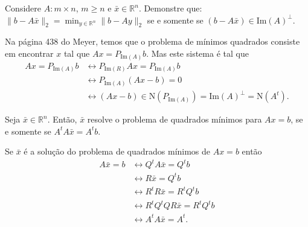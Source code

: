 \documentclass[a4paper,12pt, leqno, answers]{exam}
\begin{document}
\thispagestyle{headandfoot}
\begin{questions}
    \question Considere $A : m \times n$, $m \geq n$ e $\bar{x} \in \mathbb{R}^n$. Demonstre que: $\| b - A \bar{x} \|_2 = \min_{y \in \mathbb{R}^n} \| b - A y \|_2$ se e somente se $(b - A \bar{x}) \in \text{Im}(A)^\perp$.
    \begin{solution}
        Na p\'{a}gina 438 do Meyer\nocite{Meyer:2000:matrix}, temos que o problema de m\'{i}nimos quadrados consiste em encontrar $x$ tal que $A x = P_{\text{Im}(A)} b$. Mas este sistema \'{e} tal que
        \begin{align*}
            A x = P_{\text{Im}(A)} b &\leftrightarrow P_{\text{Im}(R)} A x = P_{\text{Im}(A)} b \\
            &\leftrightarrow P_{\text{Im}(A)} \left( A x - b \right) = 0 \\
            &\leftrightarrow \left( A x - b \right) \in \text{N}(P_{\text{Im}(A)}) = \text{Im}(A)^\perp = \text{N}(A^t).
        \end{align*}
    \end{solution}
    \question Seja $\bar{x} \in \mathbb{R}^n$. Ent\~{a}o, $\bar{x}$ resolve o problema de quadrados m\'{i}nimos para $A x = b$, se e somente se $A^t A \bar{x} = A^t b$.
    \begin{solution}
        Se $\bar{x}$ \'{e} a solu\c{c}\~{a}o do problema de quadrados m\'{i}nimos de $A x = b$ ent\~{a}o
        \begin{align*}
            A \bar{x} = b &\leftrightarrow Q^t A \bar{x} = Q^t b \\
            &\leftrightarrow R \bar{x} = Q^t b \\
            &\leftrightarrow R^t R \bar{x} = R^t Q^t b \\
            &\leftrightarrow R^t Q^t Q R \bar{x} = R^t Q^t b \\
            &\leftrightarrow A^t A \bar{x} = A^t.
        \end{align*}
    \end{solution}


\end{questions}
\end{document}

